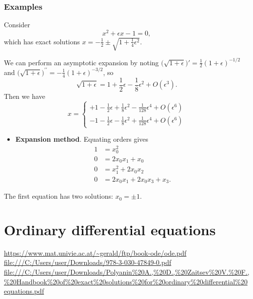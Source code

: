\subsection{Examples}
\begin{example}
Consider
\begin{equation}
x^2 + \epsilon x - 1 = 0,
\end{equation}
which has exact solutions $x = -\frac{1}{2} \pm \sqrt{1+\frac{1}{4}\epsilon^2}$.

We can perform an asymptotic expansion by noting $\big(\sqrt{1+\epsilon}\big)' = \frac{1}{2}(1+\epsilon)^{-1/2}$ and $\big(\sqrt{1+\epsilon}\big)^{\prime\prime} = -\frac{1}{4}(1+\epsilon)^{-3/2}$, so
\[ \sqrt{1+\epsilon} = 1 +\frac{1}{2}\epsilon - \frac{1}{8}\epsilon^2 + O(\epsilon^3). \]
Then we have
\[ x = \begin{cases}
+1 - \frac{1}{2}\epsilon +\frac{1}{8}\epsilon^2 - \frac{1}{128}\epsilon^4 + O(\epsilon^6) \\
-1 - \frac{1}{2}\epsilon -\frac{1}{8}\epsilon^2 + \frac{1}{128}\epsilon^4 + O(\epsilon^6)
\end{cases} \]

\begin{itemize}
\item \textbf{Expansion method}. Equating orders gives
\begin{align*}
1 &= x_0^2 \\
0 &= 2x_0x_1 + x_0 \\
0 &= x_1^2 + 2x_0x_2 \\
0 &= 2x_0x_1 + 2x_0x_3 + x_3.
\end{align*}
\end{itemize}
The first equation has two solutions: $x_0 = \pm 1$. 
\end{example}


\chapter{Ordinary differential equations}
\url{https://www.mat.univie.ac.at/~gerald/ftp/book-ode/ode.pdf}
\url{file:///C:/Users/user/Downloads/978-3-030-47849-0.pdf}
\url{file:///C:/Users/user/Downloads/Polyanin%20A.,%20D.,%20Zaitsev%20V.%20F.,%20Handbook%20of%20exact%20solutions%20for%20ordinary%20differential%20equations.pdf}

